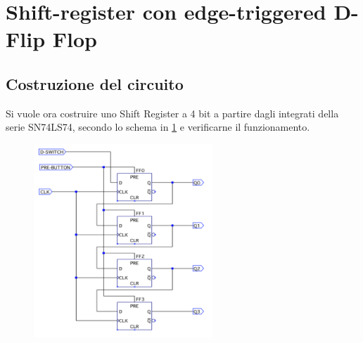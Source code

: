 \documentclass[10pt, a4paper, italian]{article}
\begin{document}
\section{Shift-register con edge-triggered D-Flip Flop}
\subsection{Costruzione del circuito}
Si vuole ora costruire uno Shift Register a 4 bit a partire dagli integrati della serie SN74LS74, secondo lo schema in \cref{fig: schem_shift} e verificarne il funzionamento.
\begin{figure}[htbp]
\centering
	\includegraphics[width=0.6\textwidth]{schem_shift}
	\caption{\label{fig: schem_shift}}
\end{figure}
\end{document}
